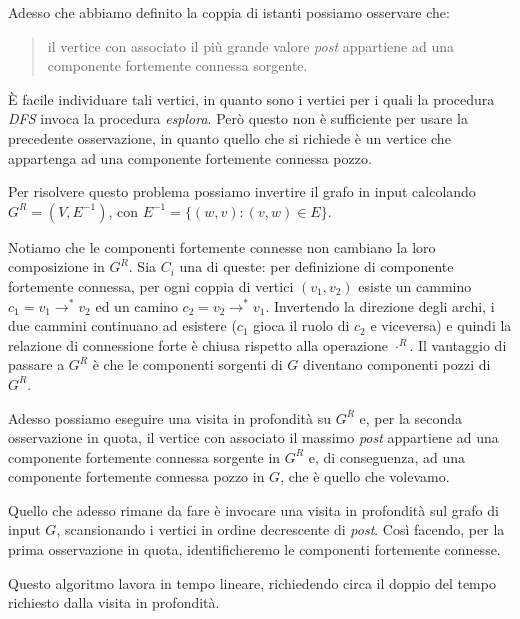 Adesso che abbiamo definito la coppia di istanti possiamo osservare
che: 
\begin{quotation}
  il vertice con associato il pi\`u grande valore \emph{post}
  appartiene ad una componente fortemente connessa sorgente.
\end{quotation}

\`E facile individuare tali vertici, in quanto sono i vertici per i
quali la procedura \emph{DFS} invoca la procedura
\emph{esplora}. Per\`o questo non \`e sufficiente per usare la
precedente osservazione, in quanto quello che si richiede \`e un
vertice che appartenga ad una componente fortemente connessa pozzo.

Per risolvere questo problema possiamo invertire il grafo in input
calcolando $G^{R} = (V, E^{-1})$, con $E^{-1} = \{(w, v): (v, w) \in
E\}$.

Notiamo che le componenti fortemente connesse non cambiano la loro
composizione in $G^{R}$. Sia $C_{i}$ una di queste: per definizione di
componente fortemente connessa, per ogni coppia di vertici $(v_{1},
v_{2})$ esiste un cammino $c_{1} = v_{1}\rightarrow^{*} v_{2}$ ed un
camino $c_{2} = v_{2}\rightarrow^{*} v_{1}$. Invertendo la direzione
degli archi, i due cammini continuano ad esistere ($c_{1}$ gioca il
ruolo di $c_{2}$ e viceversa) e quindi la relazione di connessione
forte \`e chiusa rispetto alla operazione $\cdot ^{R}$. Il vantaggio
di passare a $G^{R}$ \`e che le componenti sorgenti di $G$ diventano
componenti pozzi di $G^{R}$.

Adesso possiamo eseguire una visita in profondit\`a su $G^{R}$
e, per la seconda osservazione in quota, il vertice con associato il
massimo \emph{post} appartiene ad una componente fortemente connessa
sorgente in $G^{R}$ e, di conseguenza, ad una componente fortemente
connessa pozzo in $G$, che \`e quello che volevamo.

Quello che adesso rimane da fare \`e invocare una visita in
profondit\`a sul grafo di input $G$, scansionando i vertici in ordine
decrescente di \emph{post}. Cos\`i facendo, per la prima osservazione
in quota, identificheremo le componenti fortemente connesse.

Questo algoritmo lavora in tempo lineare, richiedendo circa il doppio
del tempo richiesto dalla visita in profondit\`a.

